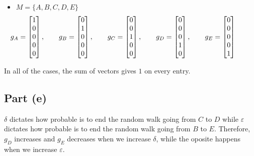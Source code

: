 \begin{itemize}
    \item $M = \{A,B,C,D,E\}$
    \[ \hspace*{-4em}\renewcommand*{\arraystretch}{1}\everymath{\displaystyle}
    g_A = \left[\begin{matrix}1\\0\\0\\0\\0\end{matrix}\right], \hspace*{2em}
    g_B = \left[\begin{matrix}0\\1\\0\\0\\0\end{matrix}\right], \hspace*{2em}
    g_C = \left[\begin{matrix}0\\0\\1\\0\\0\end{matrix}\right], \hspace*{2em}
    g_D = \left[\begin{matrix}0\\0\\0\\1\\0\end{matrix}\right], \hspace*{2em}
    g_E = \left[\begin{matrix}0\\0\\0\\0\\1\end{matrix}\right] \]
\end{itemize}

In all of the cases, the sum of vectors gives $1$ on every entry.

\subsection*{Part (e)}

$\delta$ dictates how probable is to end the random walk going from $C$ to $D$ while $\varepsilon$ dictates how probable is to end the random walk going from $B$ to $E$. Therefore, $g_D$ increases and $g_E$ decreases when we increase $\delta$, while the oposite happens when we increase $\varepsilon$.
